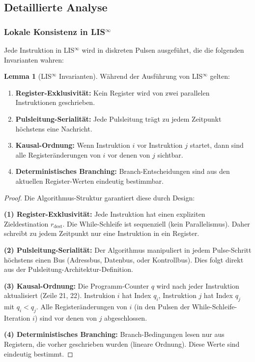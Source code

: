 \documentclass[a4paper,12pt]{article}
\theoremstyle{definition}
\newtheorem{lemma}{Lemma}
\begin{document}
\subsection{Detaillierte Analyse}

\subsubsection[Lokale Konsistenz in LIS-infty]{Lokale Konsistenz in LIS$^{\infty}$}

Jede Instruktion in LIS$^{\infty}$ wird in diskreten Pulsen ausgeführt, die die folgenden Invarianten wahren:

\begin{lemma}[LIS$^{\infty}$ Invarianten]
	\label{lem:lis_invarianten}
	Während der Ausführung von LIS$^{\infty}$ gelten:
	\begin{enumerate}
		\item \textbf{Register-Exklusivität:} Kein Register wird von zwei parallelen Instruktionen geschrieben.
		\item \textbf{Pulsleitung-Serialität:} Jede Pulsleitung trägt zu jedem Zeitpunkt höchstens eine Nachricht.
		\item \textbf{Kausal-Ordnung:} Wenn Instruktion $i$ vor Instruktion $j$ startet, dann sind alle Registeränderungen von $i$ vor denen von $j$ sichtbar.
		\item \textbf{Deterministisches Branching:} Branch-Entscheidungen sind aus den aktuellen Register-Werten eindeutig bestimmbar.
	\end{enumerate}
\end{lemma}

\begin{proof}
	Die Algorithmus-Struktur garantiert diese durch Design:
	
	\textbf{(1) Register-Exklusivität:} Jede Instruktion hat einen expliziten Zieldestination $r_{\text{dest}}$. Die While-Schleife ist sequenziell (kein Parallelismus). Daher schreibt zu jedem Zeitpunkt nur eine Instruktion in ein Register.
	
	\textbf{(2) Pulsleitung-Serialität:} Der Algorithmus manipuliert in jedem Pulse-Schritt höchstens einen Bus (Adressbus, Datenbus, oder Kontrollbus). Dies folgt direkt aus der Pulsleitung-Architektur-Definition.
	
	\textbf{(3) Kausal-Ordnung:} Die Programm-Counter $q$ wird nach jeder Instruktion aktualisiert (Zeile 21, 22). Instrukion $i$ hat Index $q_i$, Instruktion $j$ hat Index $q_j$ mit $q_i < q_j$. Alle Registeränderungen von $i$ (in den Pulsen der While-Schleife-Iteration $i$) sind vor denen von $j$ abgeschlossen.
	
	\textbf{(4) Deterministisches Branching:} Branch-Bedingungen lesen nur aus Registern, die vorher geschrieben wurden (lineare Ordnung). Diese Werte sind eindeutig bestimmt.
\end{proof}
\end{document}
